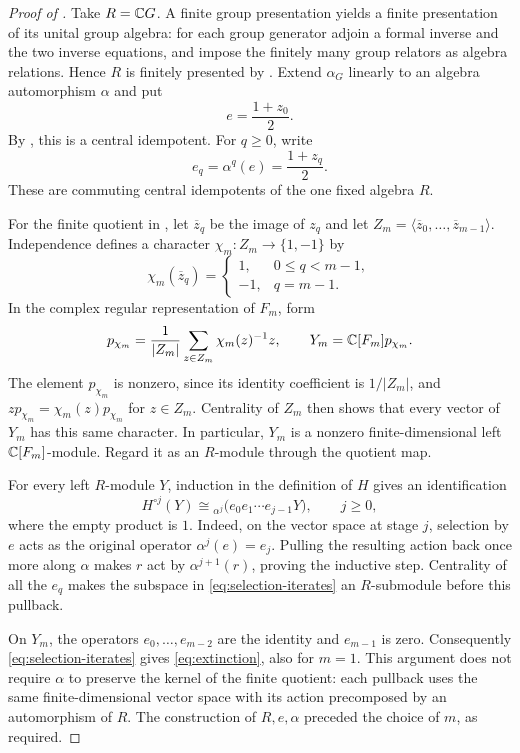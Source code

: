 \begin{proof}[Proof of ]
Take $R=\mathbb C G$.  A finite group presentation yields a finite
presentation of its unital group algebra: for each group generator
adjoin a formal inverse and the two inverse equations, and impose
the finitely many group relators as algebra relations.  Hence $R$
is finitely presented by .
Extend $\alpha_G$ linearly to an algebra automorphism $\alpha$ and put
\[
  e=\frac{1+z_0}{2}.
\]
By , this is a central idempotent.  For
$q\geq0$, write
\[
  e_q=\alpha^q(e)=\frac{1+z_q}{2}.
\]
These are commuting central idempotents of the one fixed algebra $R$.

For the finite quotient in , let
$\overline z_q$ be the image of $z_q$ and let
$Z_m=\langle\overline z_0,\ldots,\overline z_{m-1}\rangle$.
Independence defines a character $\chi_m:Z_m\to\{1,-1\}$ by
\[
 \chi_m(\overline z_q)=
 \begin{cases}
   1,&0\leq q<m-1,\\
   -1,&q=m-1.
 \end{cases}
\]
In the complex regular representation of $F_m$, form
\[
  p_{\chi_m}=\frac{1}{|Z_m|}
       \sum_{z\in Z_m}\chi_m(z)^{-1}z,
  \qquad
  Y_m=\mathbb C[F_m]p_{\chi_m}.
\]
The element $p_{\chi_m}$ is nonzero, since its identity coefficient
is $1/|Z_m|$, and $z p_{\chi_m}=\chi_m(z)p_{\chi_m}$ for
$z\in Z_m$.  Centrality of $Z_m$ then shows that every vector of
$Y_m$ has this same character.  In particular, $Y_m$ is a nonzero
finite-dimensional left $\mathbb C[F_m]$-module.  Regard it as an
$R$-module through the quotient map.

For every left $R$-module $Y$, induction in the definition of $H$
gives an identification
\begin{equation}
  H^{\circ j}(Y)\cong {}_{\alpha^j}
       \bigl(e_0e_1\cdots e_{j-1}Y\bigr),
  \qquad j\geq0,
  \label{eq:selection-iterates}
\end{equation}
where the empty product is $1$.  Indeed, on the vector space at
stage $j$, selection by $e$ acts as the original operator
$\alpha^j(e)=e_j$.  Pulling the resulting action back once more
along $\alpha$ makes $r$ act by $\alpha^{j+1}(r)$, proving the
inductive step.  Centrality of all the $e_q$ makes the subspace in
\eqref{eq:selection-iterates} an $R$-submodule before this pullback.

On $Y_m$, the operators $e_0,\ldots,e_{m-2}$ are the identity and
$e_{m-1}$ is zero.  Consequently \eqref{eq:selection-iterates}
gives \eqref{eq:extinction}, also for $m=1$.  This argument does
not require $\alpha$ to preserve the kernel of the finite quotient:
each pullback uses the same finite-dimensional vector space with
its action precomposed by an automorphism of $R$.  The construction
of $R,e,\alpha$ preceded the choice of $m$, as required.
\end{proof}
